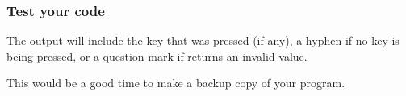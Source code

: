 \subsubsection*{Test your code}

\begin{description}
\end{description}
The output will include the key that was pressed (if any), a hyphen if no key is being pressed, or a question mark if  returns an invalid value.

\vspace{1cm}

This would be a good time to make a backup copy of your program.


